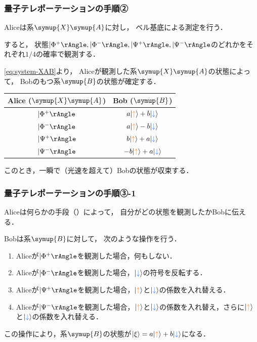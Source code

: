 \documentclass[
    10pt,
    ]{sotsu-beamer}
\newcommand{\bitone}{\mathcolor{fire}{\uparrow}}
\newcommand{\bittwo}{\mathcolor{water}{\downarrow}}
\begin{document}
\begin{frame}
    \frametitle{量子テレポーテーションの手順②}

    Aliceは系$\symup{X}\symup{A}$に対し，
    ベル基底による測定を行う．

    すると，
    状態$\Ket{\Phi^+}, \Ket{\Phi^-}, \Ket{\Psi^+}, \Ket{\Psi^-}$のどれかをそれぞれ$1/4$の確率で観測する．

    \eqref{eq:system-XAB}より，
    Aliceが観測した系$\symup{X}\symup{A}$の状態によって，
    Bobのもつ系$\symup{B}$の状態が確定する．
    \begin{center}
        \begin{tabular}{c|c}
            Alice ($\symup{X}\symup{A}$)  &  Bob ($\symup{B}$)  \\
            \hline
            $\Ket{\Phi^+}$ & $a \ket{\bitone} + b \ket{\bittwo}$  \\
            $\Ket{\Phi^-}$ & $a \ket{\bitone} - b \ket{\bittwo}$  \\
            $\Ket{\Psi^+}$ & $b \ket{\bitone} + a \ket{\bittwo}$  \\
            $\Ket{\Psi^-}$ & $-b \ket{\bitone} + a \ket{\bittwo}$  \\
        \end{tabular}
    \end{center}
    このとき，一瞬で（光速を超えて）Bobの状態が収束する．

\end{frame}


\begin{frame}
    \frametitle{量子テレポーテーションの手順③-1}

    Aliceは何らかの手段（）によって，
    自分がどの状態を観測したかBobに伝える．

    Bobは系$\symup{B}$に対して，
    次のような操作を行う．
    \begin{enumerate}
        \item Aliceが$\Ket{\Phi^+}$を観測した場合，何もしない．
        \item Aliceが$\Ket{\Phi^-}$を観測した場合，$\ket{\bittwo}$の符号を反転する．
        \item Aliceが$\Ket{\Psi^+}$を観測した場合，$\ket{\bitone}$と$\ket{\bittwo}$の係数を入れ替える．
        \item Aliceが$\Ket{\Psi^-}$を観測した場合，$\ket{\bitone}$と$\ket{\bittwo}$の係数を入れ替え，さらに$\ket{\bitone}$と$\ket{\bittwo}$の係数を入れ替える．
    \end{enumerate}
    この操作により，系$\symup{B}$の状態が$\ket{\xi} = a \ket{\bitone} + b \ket{\bittwo}$になる．

\end{frame}
\end{document}
